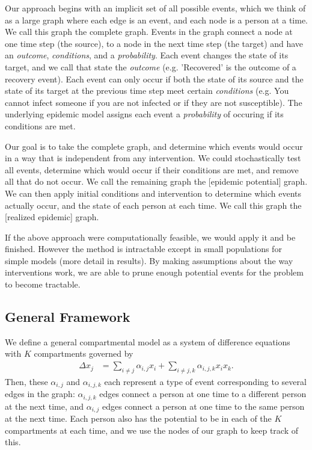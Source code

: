 \documentclass[PTRSB]{rsos}
\begin{document}
\begin{multicols}{2}
Our approach begins with an implicit set of all possible events, which we think of as a large graph where each edge is an event, and each node is a person at a time. %
We call this graph the complete graph.
Events in the graph connect a node at one time step (the source), to a node in the next time step (the target) and have an \emph{outcome}, \emph{conditions}, and a \emph{probability}.
Each event changes the state of its target, and we call that state the \emph{outcome} (e.g. 'Recovered' is the outcome of a recovery event).
Each event can only occur if both the state of its source and the state of its target at the previous time step meet certain \emph{conditions} (e.g. You cannot infect someone if you are not infected or if they are not susceptible).
The underlying epidemic model assigns each event a \emph{probability} of occuring if its conditions are met.

Our goal is to take the complete graph, and determine which events would occur in a way that is independent from any intervention.
We could stochastically test all events, determine which would occur if their conditions are met, and remove all that do not occur.
We call the remaining graph the [epidemic potential] graph.
We can then apply initial conditions and intervention to determine which events actually occur, and the state of each person at each time.
We call this graph the [realized epidemic] graph.

If the above approach were computationally feasible, we would apply it and be finished.
However the method is intractable except in small populations for simple models (more detail in results).
By making assumptions about the way interventions work, we are able to prune enough potential events for the problem to become tractable.

\subsection*{General Framework}
We define a general compartmental model as a system of difference equations with $K$ compartments governed by 
\begin{align*}
\Delta x_{j} &= \sum_{i \neq j} \alpha_{i,j}x_i + \sum_{i \neq j, k} \alpha_{i,j,k} x_ix_k.
\end{align*}
Then, these $\alpha_{i,j}$ and $\alpha_{i,j,k}$ each represent a type of event corresponding to several edges in the graph: $\alpha_{i,j,k}$ edges connect a person at one time to a different person at the next time, and $\alpha_{i,j}$ edges connect a person at one time to the same person at the next time.
Each person also has the potential to be in each of the $K$ compartments at each time, and we use the nodes of our graph to keep track of this.


\end{multicols}
\end{document}
